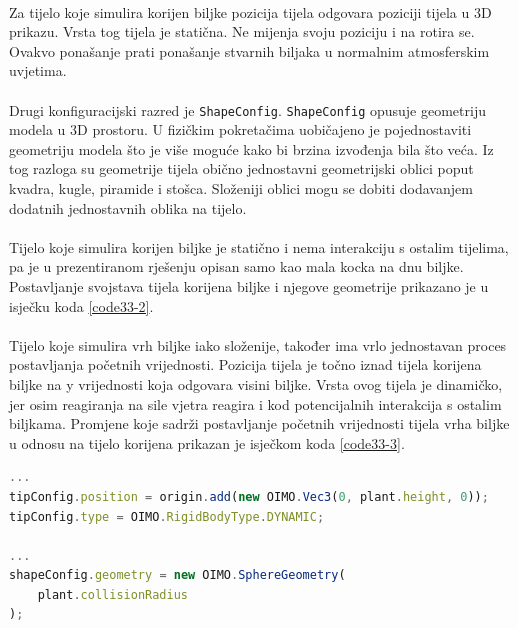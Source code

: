 \documentclass[times, utf8, diplomski]{fer}
\begin{document}
\paragraph{}
Za tijelo koje simulira korijen biljke pozicija tijela odgovara poziciji tijela u 3D 
prikazu. Vrsta tog tijela je statična. Ne mijenja svoju poziciju i na rotira se. Ovakvo
ponašanje prati ponašanje stvarnih biljaka u normalnim atmosferskim uvjetima.

\paragraph{}
Drugi konfiguracijski razred je \verb#ShapeConfig#. \verb#ShapeConfig# opusuje geometriju 
modela u 3D prostoru. U fizičkim pokretačima uobičajeno je pojednostaviti geometriju modela
što je više moguće kako bi brzina izvođenja bila što veća. Iz tog razloga su geometrije 
tijela obično jednostavni geometrijski oblici poput kvadra, kugle, piramide i stošca.
Složeniji oblici mogu se dobiti dodavanjem dodatnih jednostavnih oblika na tijelo.

\paragraph{}
Tijelo koje simulira korijen biljke je statično i nema interakciju s ostalim tijelima, pa je
u prezentiranom rješenju opisan samo kao mala kocka na dnu biljke. Postavljanje svojstava 
tijela korijena biljke i njegove geometrije prikazano je u isječku koda \ref{code33-2}.

\paragraph{}
Tijelo koje simulira vrh biljke iako složenije, također ima vrlo jednostavan proces 
postavljanja početnih vrijednosti. Pozicija tijela je točno iznad tijela korijena biljke na
y vrijednosti koja odgovara visini biljke. Vrsta ovog tijela je dinamičko, jer osim 
reagiranja na sile vjetra reagira i kod potencijalnih interakcija s ostalim biljkama. 
Promjene koje sadrži postavljanje početnih vrijednosti tijela vrha biljke u odnosu na tijelo 
korijena prikazan je isječkom koda \ref{code33-3}.

\begin{lstlisting}[language=Javascript,label=code33-3,caption=Postavljanje tijela vrha biljke]
...
tipConfig.position = origin.add(new OIMO.Vec3(0, plant.height, 0));
tipConfig.type = OIMO.RigidBodyType.DYNAMIC;

...
shapeConfig.geometry = new OIMO.SphereGeometry(
	plant.collisionRadius
);
\end{lstlisting}
\end{document}
